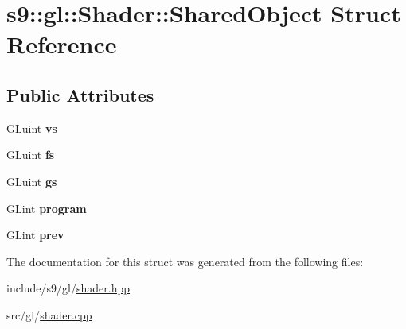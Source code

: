 \hypertarget{structs9_1_1gl_1_1Shader_1_1SharedObject}{\section{s9\-:\-:gl\-:\-:Shader\-:\-:Shared\-Object Struct Reference}
\label{structs9_1_1gl_1_1Shader_1_1SharedObject}
}
\subsection*{Public Attributes}
\begin{DoxyCompactItemize}
\item 
\hypertarget{structs9_1_1gl_1_1Shader_1_1SharedObject_a0b65334a30f51be2b2c64e6eff7a3f45}{G\-Luint {\bfseries vs}}\label{structs9_1_1gl_1_1Shader_1_1SharedObject_a0b65334a30f51be2b2c64e6eff7a3f45}

\item 
\hypertarget{structs9_1_1gl_1_1Shader_1_1SharedObject_ad5a54f5f812ac1835365763b15e53b84}{G\-Luint {\bfseries fs}}\label{structs9_1_1gl_1_1Shader_1_1SharedObject_ad5a54f5f812ac1835365763b15e53b84}

\item 
\hypertarget{structs9_1_1gl_1_1Shader_1_1SharedObject_aa1f3d132bb86b033316a270795ade885}{G\-Luint {\bfseries gs}}\label{structs9_1_1gl_1_1Shader_1_1SharedObject_aa1f3d132bb86b033316a270795ade885}

\item 
\hypertarget{structs9_1_1gl_1_1Shader_1_1SharedObject_ad86dffd0205eb5cdf59116c905fd099c}{G\-Lint {\bfseries program}}\label{structs9_1_1gl_1_1Shader_1_1SharedObject_ad86dffd0205eb5cdf59116c905fd099c}

\item 
\hypertarget{structs9_1_1gl_1_1Shader_1_1SharedObject_acb965810c4d75dfc3937b9c7f5f1158e}{G\-Lint {\bfseries prev}}\label{structs9_1_1gl_1_1Shader_1_1SharedObject_acb965810c4d75dfc3937b9c7f5f1158e}

\end{DoxyCompactItemize}


The documentation for this struct was generated from the following files\-:\begin{DoxyCompactItemize}
\item 
include/s9/gl/\hyperlink{shader_8hpp}{shader.\-hpp}\item 
src/gl/\hyperlink{shader_8cpp}{shader.\-cpp}\end{DoxyCompactItemize}
